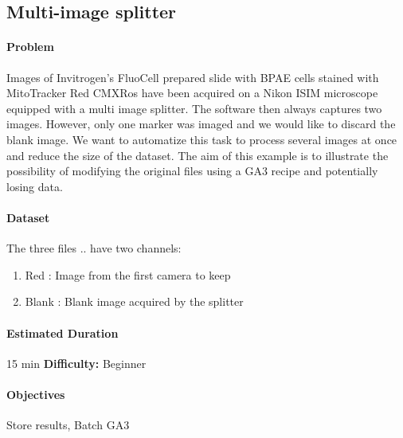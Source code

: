 \subsection{Multi-image splitter}

\paragraph{Problem}

Images of Invitrogen's FluoCell prepared slide with BPAE cells stained with MitoTracker Red CMXRos have been acquired on a Nikon ISIM microscope equipped with a multi image splitter. The software then always captures two images. However, only one marker was imaged and we would like to discard the blank image. We want to automatize this task to process several images at once and reduce the size of the dataset. The aim of this example is to illustrate the possibility of modifying the original files using a GA3 recipe and potentially losing data.

\paragraph{Dataset} The three files  ..  have two channels:
    \begin{enumerate}\itemsep0em
        \item Red : Image from the first camera to keep
        \item Blank : Blank image acquired by the splitter
    \end{enumerate}

\paragraph{Estimated Duration} 15 min \quad \textbf{Difficulty:} Beginner

\paragraph{Objectives} 
Store results, 
Batch GA3

